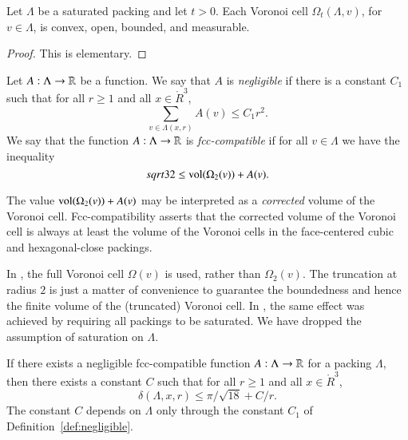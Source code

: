 \begin{lemma} Let $\Lambda$ be a saturated packing and let $t>0$.
Each Voronoi cell $\Omega_t(\Lambda,v)$, for $v\in\Lambda$, is
convex, open, bounded, and measurable.
\end{lemma}

\begin{proof}  This is elementary.
\end{proof}

\begin{definition}[negligible]\label{def:negligible}
Let $A:\Lambda\to{\mathbb R}$ be a function.  We say that $A$
is
  {\it negligible\/}
if there is a constant $C_1$ such that for all $r\ge1$ and all
$x\in\ring{R}^3$,
   $$\sum_{v\in\Lambda(x,r)} A(v) \le C_1 r^2.$$
We say that the function $A:\Lambda\to{\mathbb R}$ is
  {\it fcc-compatible\/}
if for all $v\in\Lambda$ we have the inequality
$$sqrt{32}\le {\operatorname{vol}}(\Omega_2(v)) + A(v).$$
\end{definition}





\begin{remark}
The value ${\operatorname{vol}}(\Omega_2(v)) + A(v)$ may be interpreted as a
{\it corrected\/} volume of the Voronoi
cell. Fcc-compatibility asserts that the corrected volume of the
Voronoi cell is always at least the volume of the Voronoi cells in
the face-centered cubic and hexagonal-close packings.
\end{remark}

\begin{remark} In \cite{Hales:2006:DCG}, the full Voronoi cell $\Omega(v)$
is used, rather than $\Omega_2(v)$.  The truncation at radius $2$
is just a matter of convenience to guarantee the boundedness
and hence the finite volume of the (truncated) Voronoi cell.
In \cite{Hales:2006:DCG}, the same effect was achieved by requiring all packings
to be saturated.  We have dropped the assumption of saturation
on $\Lambda$.
\end{remark}


\begin{lemma}
\label{lemma:deltabound} If there exists a 
negligible  fcc-compatible function
$A:\Lambda\to{\mathbb R}$ for a 
packing $\Lambda$, then there
exists a constant $C$ such that for all $r\ge1$ and all
$x\in\ring{R}^3$,
    $$
    \delta(\Lambda,x,r)
    \le \pi/\sqrt{18} + C/r.
    $$
The constant $C$ depends on $\Lambda$ only through the constant
$C_1$ of Definition~\ref{def:negligible}.
\end{lemma}



